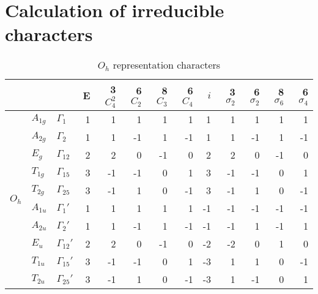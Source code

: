 \documentclass[preprint,showpacs,preprintnumbers,superscriptaddress,prb,floatfix,aps]{revtex4-1}
\begin{document}
%
%
%
\section{Calculation of irreducible characters}

\begin{table}
\caption{\label{table:chi} $O_h$ representation characters}
\begin{ruledtabular}
\begin{tabular*}{10cm}{lllrrrrrrrrrr}
  				         	 &                 &                 &  E  &3$C_4^2$& 6$C_2$ & 8$C_3$ & 6$C_4$ &  $i$ & 3$\sigma_2$ & 6$\sigma_2$ & 8$\sigma_6$ & 6$\sigma_4$ \\ \hline
\multirow{10}{*}{$O_h$}      & $A_{1g}$        & $\Gamma_{1}  $  &  1  &     1  &     1  &     1  &     1  &   1  &          1  &          1  &          1  &          1  \\         %
  				         	 & $A_{2g}$        & $\Gamma_{2}  $  &  1  &     1  &    -1  &     1  &    -1  &   1  &          1  &         -1  &          1  &         -1  \\         %
  				         	 & $E_g   $        & $\Gamma_{12} $  &  2  &     2  &     0  &    -1  &     0  &   2  &          2  &          0  &         -1  &          0  \\         %
  				         	 & $T_{1g}$        & $\Gamma_{15} $  &  3  &    -1  &    -1  &     0  &     1  &   3  &         -1  &         -1  &          0  &          1  \\         %
  				         	 & $T_{2g}$        & $\Gamma_{25} $  &  3  &    -1  &     1  &     0  &    -1  &   3  &         -1  &          1  &          0  &         -1  \\         %
  				         	 & $A_{1u}$        & $\Gamma_{1} '$  &  1  &     1  &     1  &     1  &     1  &  -1  &         -1  &         -1  &         -1  &         -1  \\         %
  				         	 & $A_{2u}$        & $\Gamma_{2} '$  &  1  &     1  &    -1  &     1  &    -1  &  -1  &         -1  &          1  &         -1  &          1  \\         %
  				         	 & $E_u   $        & $\Gamma_{12}'$  &  2  &     2  &     0  &    -1  &     0  &  -2  &         -2  &          0  &          1  &          0  \\         %
  				         	 & $T_{1u}$        & $\Gamma_{15}'$  &  3  &    -1  &    -1  &     0  &     1  &  -3  &          1  &          1  &          0  &         -1  \\         %
  				         	 & $T_{2u}$        & $\Gamma_{25}'$  &  3  &    -1  &     1  &     0  &    -1  &  -3  &          1  &         -1  &          0  &          1  \\ \hline  %


\end{tabular*}
\end{ruledtabular}
\end{table}
\end{document}
